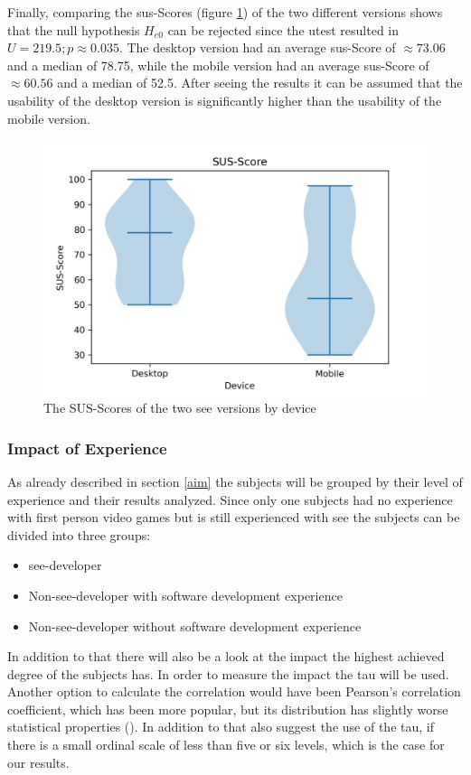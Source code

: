 Finally, comparing the \gls{sus}-Scores (figure \ref{fig:sus-vio}) of the two different versions shows that the null hypothesis $H_{e0}$ can be rejected since the \gls{utest} resulted in $U = 219.5; p \approx 0.035$.
The desktop version had an average \gls{sus}-Score of $\approx 73.06$ and a median of 78.75, while the mobile version had an average \gls{sus}-Score of $\approx 60.56$ and a median of 52.5. 
After seeing the results it can be assumed that the \gls{usability} of the desktop version is significantly higher than the \gls{usability} of the mobile version.
\begin{figure}[htb]
  \centering
  \includegraphics[width=1\textwidth]{Evaluation/img/SUS-Score_violin.png}
  \caption{The SUS-Scores of the two \gls{see} versions by device}\label{fig:sus-vio}
\end{figure}

\subsubsection{Impact of Experience}
\label{sec:experinece}
As already described in section \ref{aim} the subjects will be grouped by their level of experience and their results analyzed.
Since only one subjects had no experience with first person video games but is still experienced with \gls{see} the subjects can be divided into three groups: 
\begin{itemize}
  \item \gls{see}-developer
  \item Non-\gls{see}-developer with software development experience
  \item Non-\gls{see}-developer without software development experience
\end{itemize}
In addition to that there will also be a look at the impact the highest achieved degree of the subjects has.
In order to measure the impact the \gls{tau} will be used.
Another option to calculate the correlation would have been Pearson’s correlation coefficient, which has been more popular, but its distribution has slightly worse statistical properties (\cite{hauke2011comparison}).
In addition to that \cite{khamis2008measures} also suggest the use of the \gls{tau}, if there is a small ordinal scale of less than five or six levels, which is the case for our results.

